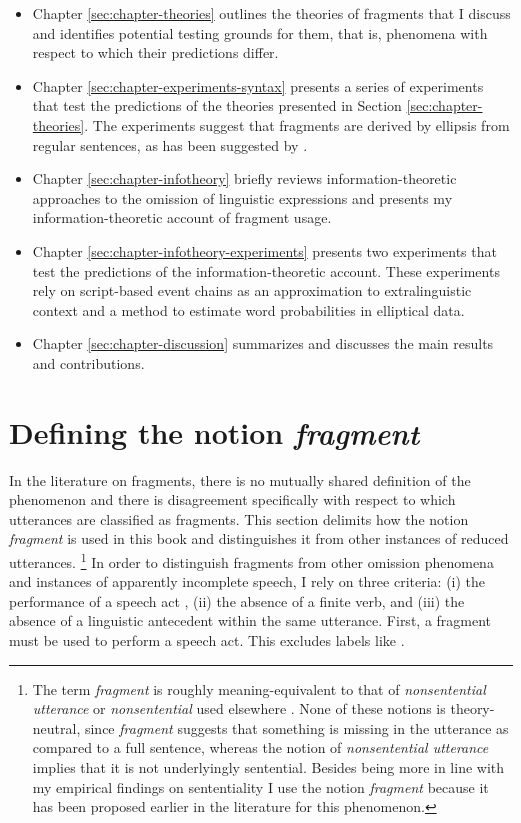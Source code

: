 \begin{itemize}\itemsep0em
 \item Chapter \ref{sec:chapter-theories} outlines the theories of fragments that I discuss and identifies potential testing grounds for them, that is, phenomena with respect to which their predictions differ.
 \item Chapter \ref{sec:chapter-experiments-syntax} presents a series of experiments that test the predictions of the theories presented in Section \ref{sec:chapter-theories}. The experiments suggest that fragments are derived by ellipsis from regular sentences, as has been suggested by \citet{reich2007}.
 \item Chapter \ref{sec:chapter-infotheory} briefly reviews information-theoretic approaches to the omission of linguistic expressions and presents my information-theoretic account of fragment usage.
 \item Chapter \ref{sec:chapter-infotheory-experiments} presents two experiments that test the predictions of the infor\-ma\-tion-theoretic account. These experiments rely on script-based event chains as an approximation to extralinguistic context and a method to estimate word probabilities in elliptical data.
 \item Chapter \ref{sec:chapter-discussion} summarizes and discusses the main results and contributions.
\end{itemize}

\section{Defining the notion \textit{fragment}}
\label{sec:intro-fragments}
In the literature on fragments, there is no mutually shared definition of the phenomenon and there is disagreement specifically with respect to which utterances are classified as fragments. This section delimits how the notion \textit{fragment} is used in this book and distinguishes it from other instances of reduced utterances.%
%
\footnote{The term \textit{fragment} is roughly meaning-equivalent to that of \textit{nonsentential utterance} or \textit{nonsentential} used elsewhere \citep{fernandez.ginzburg2002, barton.progovac2005, stainton2006}. None of these notions is theory-neutral, since \textit{fragment} suggests that something is missing in the utterance as compared to a full sentence, whereas the notion of \textit{nonsentential utterance} implies that it is not underlyingly sentential. Besides being more in line with my empirical findings on sententiality I use the notion \textit{fragment} because it has been proposed earlier in the literature for this phenomenon.}\afterfn%
%
In order to distinguish fragments from other omission phenomena and instances of apparently incomplete speech, I rely on three criteria: (i) the performance of a speech act \citep{morgan1973}, (ii) the absence of a finite verb, and (iii) the absence of a linguistic antecedent within the same utterance. First, a fragment must be used to perform a speech act. This excludes labels \citep{klein1993} like \Next.

